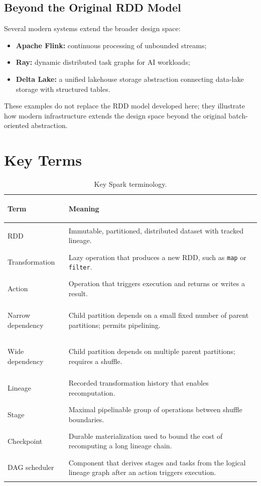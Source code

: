 \documentclass[11pt,a4paper,oneside]{book}
\begin{document}
\subsection{Beyond the Original RDD Model}

Several modern systems extend the broader design space:

\begin{itemize}
    \item \textbf{Apache Flink:} continuous processing of unbounded streams;
    \item \textbf{Ray:} dynamic distributed task graphs for AI workloads;
    \item \textbf{Delta Lake:} a unified lakehouse storage abstraction connecting data-lake storage with structured tables.
\end{itemize}

These examples do not replace the RDD model developed here; they illustrate how modern infrastructure extends the design space beyond the original batch-oriented abstraction.

\section{Key Terms}

\begin{table}[htbp]
\centering
\caption{Key Spark terminology.}
\label{tab:spark-key-terms}
\begin{tabularx}{\textwidth}{>{\bfseries\raggedright\arraybackslash}p{3.4cm} Y}
\toprule
{}
Term & Meaning \\
\midrule
RDD & Immutable, partitioned, distributed dataset with tracked lineage. \\
Transformation & Lazy operation that produces a new RDD, such as \texttt{map} or \texttt{filter}. \\
Action & Operation that triggers execution and returns or writes a result. \\
Narrow dependency & Child partition depends on a small fixed number of parent partitions; permits pipelining. \\
Wide dependency & Child partition depends on multiple parent partitions; requires a shuffle. \\
Lineage & Recorded transformation history that enables recomputation. \\
Stage & Maximal pipelinable group of operations between shuffle boundaries. \\
Checkpoint & Durable materialization used to bound the cost of recomputing a long lineage chain. \\
DAG scheduler & Component that derives stages and tasks from the logical lineage graph after an action triggers execution. \\
\bottomrule
\end{tabularx}
\end{table}
\end{document}
